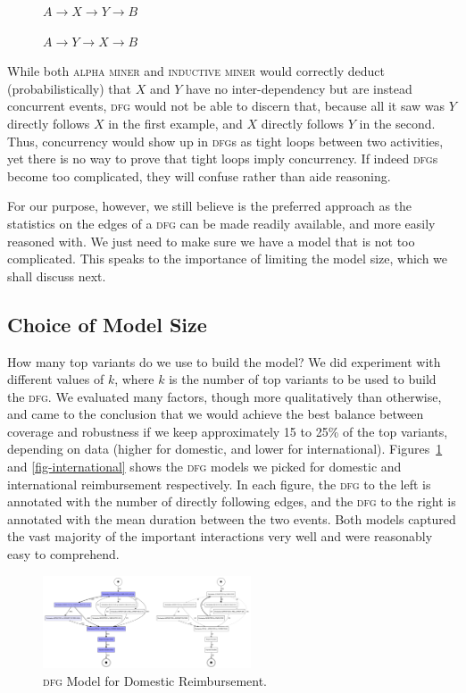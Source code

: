 \documentclass[conference]{IEEEtran}
\begin{document}
\vspace{0.5em}
$\phantom{xxxxx}A \rightarrow X \rightarrow Y \rightarrow B$

$\phantom{xxxxx}A \rightarrow Y \rightarrow X \rightarrow B$
\vspace{0.5em}


While both \textsc{alpha miner} and \textsc{inductive miner} would correctly deduct
(probabilistically) that $X$ and $Y$ have no inter-dependency but are
instead concurrent events, \textsc{dfg} would not be able to discern that, because
all it saw was $Y$ directly follows $X$ in the first example, and
$X$ directly follows $Y$ in the second. Thus, concurrency would
show up in \textsc{dfg}s as tight loops between two activities, yet there is no
way to prove that tight loops imply concurrency. If indeed \textsc{dfg}s
become too complicated, they will confuse rather than aide reasoning.

For our purpose, however, we still believe 
is the preferred approach as the statistics on the edges of a \textsc{dfg} can be
made readily available, and more easily reasoned with. We just need to make
sure we have a model that is not too complicated.
This speaks to the importance of limiting the model size, which we shall
discuss next.

\subsection{Choice of Model Size}

How many top variants do we use to build the model?
We did experiment with different values of $k$, where $k$ is the number of
top variants to be used to build the \textsc{dfg}. We
evaluated many factors, though more qualitatively than otherwise,
and came to the conclusion
that we would achieve the best balance between coverage and robustness if
we keep approximately 15 to 25\% of the top variants, depending on data
(higher for domestic, and lower for international). Figures~\ref{fig-domestic}
and \ref{fig-international} shows the \textsc{dfg} models we picked for
domestic and international reimbursement respectively. In each figure,
the \textsc{dfg} to the left is annotated with the number of directly following
edges, and the \textsc{dfg} to the right is annotated with the mean duration between
the two events. Both models captured the vast majority of the important
interactions very well and were reasonably easy to comprehend.

\begin{figure}[htbp]
\centerline{\includegraphics[width=0.55\textwidth]{images/domestic.png}}
\caption{\textsc{dfg} Model for Domestic Reimbursement.}
\label{fig-domestic}
\end{figure}
\end{document}
